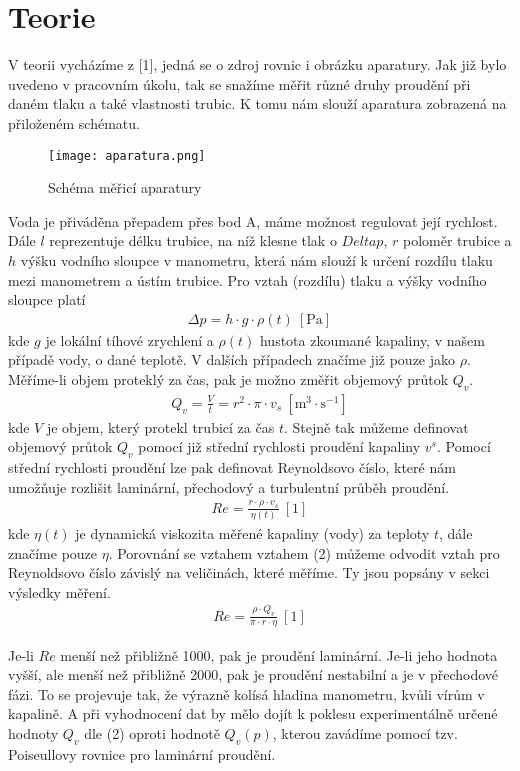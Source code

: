 \documentclass[a4paper]{article}
\begin{document}
\section*{Teorie}
\par V teorii vycházíme z [1], jedná se o zdroj rovnic i obrázku aparatury. Jak již bylo uvedeno v pracovním úkolu, tak se snažíme měřit různé druhy proudění při daném tlaku a také vlastnosti trubic. K tomu nám slouží aparatura zobrazená na přiloženém schématu.
\begin{figure}[H]
\centering
\caption{Schéma měřicí aparatury}
\texttt{[image: aparatura.png]}
\end{figure}
Voda je přiváděna přepadem přes bod A, máme možnost regulovat její rychlost. Dále $l$ reprezentuje délku trubice, na níž klesne tlak o $Delta p$, $r$ poloměr trubice a $h$ výšku vodního sloupce v manometru, která nám slouží k určení rozdílu tlaku mezi manometrem a ústím trubice. Pro vztah (rozdílu) tlaku a výšky vodního sloupce platí
\begin{align}
\Delta p = h \cdot g \cdot \rho(t) \: \mathrm{[Pa]}
\end{align}
kde $g$ je lokální tíhové zrychlení a $\rho(t)$ hustota zkoumané kapaliny, v našem případě vody, o dané teplotě. V dalších případech značíme již pouze jako $\rho$. Měříme-li objem proteklý za čas, pak je možno změřit objemový průtok $Q_{v}$.
\begin{align}
Q_{v} = \frac{V}{t} = r^{2} \cdot \pi \cdot v_{s} \: \mathrm{[m^{3} \cdot s^{-1}]}
\end{align}
kde $V$ je objem, který protekl trubicí za čas $t$. Stejně tak můžeme definovat objemový průtok $Q_{v}$ pomocí již střední rychlosti proudění kapaliny $v^{s}$. Pomocí střední rychlosti proudění lze pak definovat Reynoldsovo číslo, které nám umožňuje rozlišit laminární, přechodový a turbulentní průběh proudění. 
\begin{align}
Re = \frac{r \cdot \rho \cdot v_{s}}{\eta(t)}  \: \mathrm{[1]}
\end{align}
kde $\eta(t)$ je dynamická viskozita měřené kapaliny (vody) za teploty $t$, dále značíme pouze $\eta$. Porovnání se vztahem vztahem (2) můžeme odvodit vztah pro Reynoldsovo číslo závislý na veličinách, které měříme. Ty jsou popsány v sekci výsledky měření.
\begin{align}
Re = \frac{\rho \cdot Q_{v}}{\pi \cdot r \cdot \eta}  \: \mathrm{[1]}
\end{align}
\par Je-li $Re$ menší než přibližně 1000, pak je proudění laminární. Je-li jeho hodnota vyšší, ale menší než přibližně 2000, pak je proudění nestabilní a je v přechodové fázi. To se projevuje tak, že výrazně kolísá hladina manometru, kvůli vírům v kapalině. A při vyhodnocení dat by mělo dojít k poklesu experimentálně určené hodnoty $Q_{v}$ dle (2) oproti hodnotě $Q_{v}(p)$, kterou zavádíme pomocí tzv. Poiseullovy rovnice pro laminární proudění.
\end{document}
